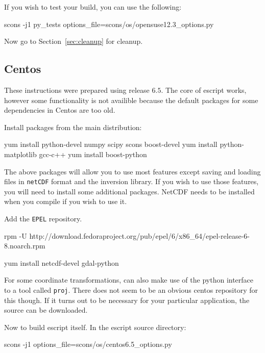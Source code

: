 \noindent If you wish to test your build, you can use the following:
\begin{shellCode}
scons -j1 py_tests options_file=scons/os/opensuse12.3_options.py 
\end{shellCode}

\noindent Now go to Section~\ref{sec:cleanup} for cleanup.

\subsection{Centos}\label{sec:centossrc}
These instructions were prepared using release $6.5$.
The core of escript works, however some functionality is not availible because the default packages for some dependencies in Centos are too old.

\noindent Install packages from the main distribution:
\begin{shellCode}
yum install python-devel numpy scipy scons boost-devel
yum install python-matplotlib gcc-c++
yum install boost-python 
\end{shellCode}

The above packages will allow you to use most features except saving and loading files in \texttt{netCDF} 
format and the \downunder inversion library.
If you wish to use those features, you will need to install some additional packages.
NetCDF needs to be installed when you compile if you wish to use it.
\begin{optionalstep}
\noindent Add the \texttt{EPEL} repository.
\begin{shellCode}
rpm -U http://download.fedoraproject.org/pub/epel/6/x86_64/epel-release-6-8.noarch.rpm
\end{shellCode}

\begin{shellCode}
yum install netcdf-devel gdal-python
\end{shellCode}
\end{optionalstep}

\noindent For some coordinate transformations, \downunder can also make use of the python interface to a tool called \texttt{proj}.
There does not seem to be an obvious centos repository for this though.
If it turns out to be necessary for your particular application, the source can be downloaded. 

\noindent Now to build escript itself.
In the escript source directory:
\begin{shellCode}
scons -j1 options_file=scons/os/centos6.5_options.py
\end{shellCode}

